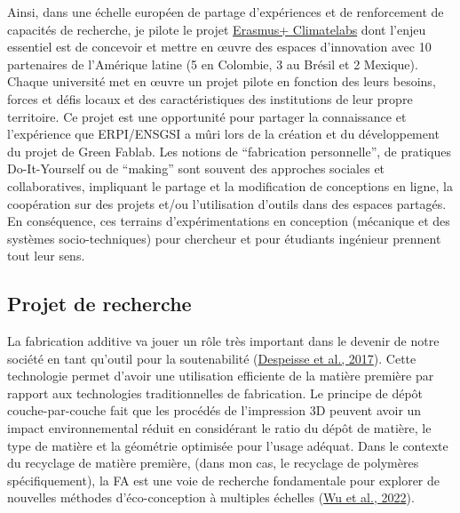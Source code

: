 \documentclass[
  11pt,
]{article}
\begin{document}
Ainsi, dans une échelle européen de partage d'expériences et de
renforcement de capacités de recherche, je pilote le projet
\href{https://erpi.univ-lorraine.fr/fr/projects/Climatelabs/}{Erasmus+
Climatelabs} dont l'enjeu essentiel est de concevoir et mettre en œuvre
des espaces d'innovation avec 10 partenaires de l'Amérique latine (5 en
Colombie, 3 au Brésil et 2 Mexique). Chaque université met en œuvre un
projet pilote en fonction des leurs besoins, forces et défis locaux et
des caractéristiques des institutions de leur propre territoire. Ce
projet est une opportunité pour partager la connaissance et l'expérience
que ERPI/ENSGSI a mûri lors de la création et du développement du projet
de Green Fablab. Les notions de ``fabrication personnelle'', de
pratiques Do-It-Yourself ou de ``making'' sont souvent des approches
sociales et collaboratives, impliquant le partage et la modification de
conceptions en ligne, la coopération sur des projets et/ou l'utilisation
d'outils dans des espaces partagés. En conséquence, ces terrains
d'expérimentations en conception (mécanique et des systèmes
socio-techniques) pour chercheur et pour étudiants ingénieur prennent
tout leur sens.

\hypertarget{projet-de-recherche}{%
\subsection{Projet de recherche}\label{projet-de-recherche}}

La fabrication additive va jouer un rôle très important dans le devenir
de notre société en tant qu'outil pour la soutenabilité
(\protect\hyperlink{ref-Despeisse2016}{Despeisse et al., 2017}). Cette
technologie permet d'avoir une utilisation efficiente de la matière
première par rapport aux technologies traditionnelles de fabrication. Le
principe de dépôt couche-par-couche fait que les procédés de
l'impression 3D peuvent avoir un impact environnemental réduit en
considérant le ratio du dépôt de matière, le type de matière et la
géométrie optimisée pour l'usage adéquat. Dans le contexte du recyclage
de matière première, (dans mon cas, le recyclage de polymères
spécifiquement), la FA est une voie de recherche fondamentale pour
explorer de nouvelles méthodes d'éco-conception à multiples échelles
(\protect\hyperlink{ref-Wu2021a}{Wu et al., 2022}).
\end{document}

